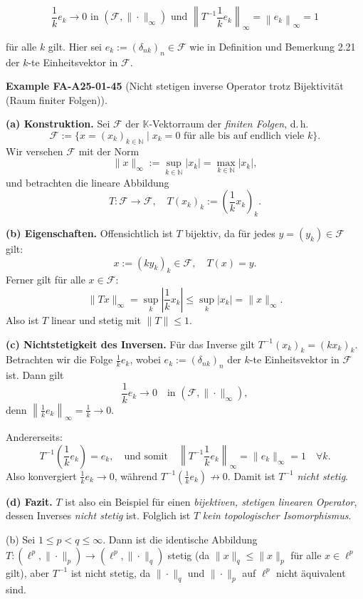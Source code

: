 \documentclass[10pt, letterpaper]{article}
\newcommand{\CustomHeading}[3]{%
  \par\medskip\noindent%
  \textbf{#1 #2} \textnormal{(#3)}.\enskip%
}
\newenvironment{EXA}[2]{\begin{unitbox}\CustomHeading{Example}{#1}{#2}}{\end{unitbox}}
\begin{document}
$$
\frac{1}{k} e_{k} \rightarrow 0 \text { in }\left(\mathcal{F},\|\cdot\|_{\infty}\right) \text { und }\left\|T^{-1} \frac{1}{k} e_{k}\right\|_{\infty}=\left\|e_{k}\right\|_{\infty}=1
$$

für alle $k$ gilt. Hier sei $e_{k}:=\left(\delta_{n k}\right)_{n} \in \mathcal{F}$ wie in Definition und Bemerkung 2.21 der $k$-te Einheitsvektor in $\mathcal{F}$.



\begin{EXA}{FA-A25-01-45}{Nicht stetigen inverse Operator trotz Bijektivität (Raum finiter Folgen)}
\textbf{(a) Konstruktion.}  
Sei $\mathcal{F}$ der $\mathbb{K}$-Vektorraum der \emph{finiten Folgen}, d.\,h.
\[
\mathcal{F} := \{x=(x_k)_{k\in\mathbb{N}} \mid x_k=0 \text{ für alle bis auf endlich viele } k\}.
\]
Wir versehen $\mathcal{F}$ mit der Norm
\[
\|x\|_\infty := \sup_{k\in\mathbb{N}} |x_k| = \max_{k\in\mathbb{N}} |x_k|,
\]
und betrachten die lineare Abbildung
\[
T:\mathcal{F}\to\mathcal{F}, \quad T(x_k)_k := \left(\frac{1}{k}x_k\right)_k.
\]

\textbf{(b) Eigenschaften.}  
Offensichtlich ist $T$ bijektiv, da für jedes $y=(y_k)\in\mathcal{F}$ gilt:
\[
x := (k y_k)_k \in \mathcal{F}, \quad T(x)=y.
\]
Ferner gilt für alle $x\in\mathcal{F}$:
\[
\|Tx\|_\infty = \sup_k \left|\frac{1}{k}x_k\right| \le \sup_k |x_k| = \|x\|_\infty.
\]
Also ist $T$ linear und stetig mit $\|T\| \le 1$.

\textbf{(c) Nichtstetigkeit des Inversen.}  
Für das Inverse gilt $T^{-1}(x_k)_k = (k x_k)_k$.  
Betrachten wir die Folge $\frac{1}{k} e_k$, wobei $e_k := (\delta_{nk})_n$ der $k$-te Einheitsvektor in $\mathcal{F}$ ist.
Dann gilt
\[
\frac{1}{k} e_k \to 0 \quad \text{in } (\mathcal{F},\|\cdot\|_\infty),
\]
denn $\left\|\frac{1}{k} e_k\right\|_\infty = \frac{1}{k} \to 0$.

Andererseits:
\[
T^{-1}\left(\frac{1}{k} e_k\right) = e_k,
\quad\text{und somit}\quad
\left\|T^{-1}\frac{1}{k} e_k\right\|_\infty = \|e_k\|_\infty = 1 \quad \forall k.
\]
Also konvergiert $\frac{1}{k} e_k \to 0$, während $T^{-1}\left(\frac{1}{k} e_k\right)\not\to 0$.  
Damit ist $T^{-1}$ \emph{nicht stetig}.

\textbf{(d) Fazit.}  
$T$ ist also ein Beispiel für einen \emph{bijektiven, stetigen linearen Operator}, dessen Inverses \emph{nicht stetig} ist.  
Folglich ist $T$ \emph{kein topologischer Isomorphismus}.
\end{EXA}


(b) Sei $1 \leq p<q \leq \infty$. Dann ist die identische Abbildung $T:\left(\ell^{p},\|\cdot\|_{p}\right) \rightarrow\left(\ell^{p},\|\cdot\|_{q}\right)$ stetig (da $\|x\|_{q} \leq\|x\|_{p}$ für alle $x \in \ell^{p}$ gilt), aber $T^{-1}$ ist nicht stetig, da $\|\cdot\|_{q}$ und $\|\cdot\|_{p}$ auf $\ell^{p}$ nicht äquivalent sind.\\
\end{document}
